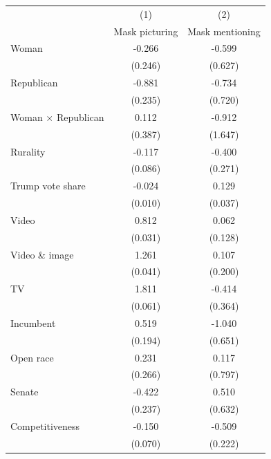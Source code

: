 \begin{tabular}{l*{2}{c}}
\toprule
                    &\multicolumn{1}{c}{(1)}&\multicolumn{1}{c}{(2)}\\
                    &\multicolumn{1}{c}{Mask picturing}&\multicolumn{1}{c}{Mask mentioning}\\
\midrule
Woman  &      -0.266         &      -0.599         \\
                    &     (0.246)         &     (0.627)         \\
Republican     &      -0.881\sym{***}&      -0.734         \\
                    &     (0.235)         &     (0.720)         \\
Woman $\times$ Republican&       0.112         &      -0.912         \\
                    &     (0.387)         &     (1.647)         \\
Rurality      &      -0.117         &      -0.400         \\
                    &     (0.086)         &     (0.271)         \\
Trump vote share             &      -0.024\sym{*}  &       0.129\sym{***}\\
                    &     (0.010)         &     (0.037)         \\
Video               &       0.812\sym{***}&       0.062         \\
                    &     (0.031)         &     (0.128)         \\
Video \& image         &       1.261\sym{***}&       0.107         \\
                    &     (0.041)         &     (0.200)         \\
TV                  &       1.811\sym{***}&      -0.414         \\
                    &     (0.061)         &     (0.364)         \\
Incumbent                   &       0.519\sym{**} &      -1.040         \\
                    &     (0.194)         &     (0.651)         \\
Open race                   &       0.231         &       0.117         \\
                    &     (0.266)         &     (0.797)         \\
Senate              &      -0.422         &       0.510         \\
                    &     (0.237)         &     (0.632)         \\
Competitiveness &      -0.150\sym{*}  &      -0.509\sym{*}  \\
                    &     (0.070)         &     (0.222)         \\


\end{tabular}
